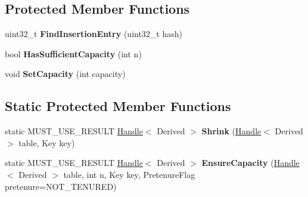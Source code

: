 \subsection*{Protected Member Functions}
\begin{DoxyCompactItemize}
\item 
uint32\+\_\+t {\bfseries Find\+Insertion\+Entry} (uint32\+\_\+t hash)\hypertarget{classv8_1_1internal_1_1_hash_table_ab5c5f8f269e12f80b7a9f4b3aed66d9d}{}\label{classv8_1_1internal_1_1_hash_table_ab5c5f8f269e12f80b7a9f4b3aed66d9d}

\item 
bool {\bfseries Has\+Sufficient\+Capacity} (int n)\hypertarget{classv8_1_1internal_1_1_hash_table_a4dae560adc69f47397a62b1b36bd4aef}{}\label{classv8_1_1internal_1_1_hash_table_a4dae560adc69f47397a62b1b36bd4aef}

\item 
void {\bfseries Set\+Capacity} (int capacity)\hypertarget{classv8_1_1internal_1_1_hash_table_ae6e89723132098336b460a8f55bc6052}{}\label{classv8_1_1internal_1_1_hash_table_ae6e89723132098336b460a8f55bc6052}

\end{DoxyCompactItemize}
\subsection*{Static Protected Member Functions}
\begin{DoxyCompactItemize}
\item 
static M\+U\+S\+T\+\_\+\+U\+S\+E\+\_\+\+R\+E\+S\+U\+LT \hyperlink{classv8_1_1internal_1_1_handle}{Handle}$<$ Derived $>$ {\bfseries Shrink} (\hyperlink{classv8_1_1internal_1_1_handle}{Handle}$<$ Derived $>$ table, Key key)\hypertarget{classv8_1_1internal_1_1_hash_table_a86f33907d7e8a6145e381c08d7c96a88}{}\label{classv8_1_1internal_1_1_hash_table_a86f33907d7e8a6145e381c08d7c96a88}

\item 
static M\+U\+S\+T\+\_\+\+U\+S\+E\+\_\+\+R\+E\+S\+U\+LT \hyperlink{classv8_1_1internal_1_1_handle}{Handle}$<$ Derived $>$ {\bfseries Ensure\+Capacity} (\hyperlink{classv8_1_1internal_1_1_handle}{Handle}$<$ Derived $>$ table, int n, Key key, Pretenure\+Flag pretenure=N\+O\+T\+\_\+\+T\+E\+N\+U\+R\+ED)\hypertarget{classv8_1_1internal_1_1_hash_table_a2943c4720b6604cce17994f1b25ec7df}{}\label{classv8_1_1internal_1_1_hash_table_a2943c4720b6604cce17994f1b25ec7df}

\end{DoxyCompactItemize}
